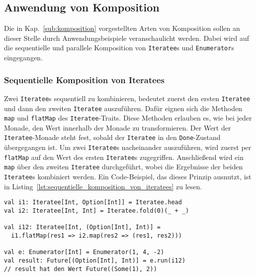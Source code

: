 


\subsection{Anwendung von Komposition} %
\label{sub:anwendung_komposition}

Die in Kap.~\ref{sub:komposition} vorgestellten Arten von Komposition sollen an dieser Stelle durch Anwendungsbeispiele veranschaulicht werden.
Dabei wird auf die sequentielle und parallele Komposition von \lstinline|Iteratee|s und \lstinline|Enumerator|s eingegangen.

\subsubsection{Sequentielle Komposition von Iteratees} %
\label{ssub:anwendung_sequentielle_komposition_von_iteratees}

Zwei \lstinline|Iteratee|s sequentiell zu kombinieren, bedeutet zuerst den ersten \lstinline|Iteratee| und dann den zweiten \lstinline|Iteratee| auszuführen.
Dafür eignen sich die Methoden \lstinline|map| und \lstinline|flatMap| des \lstinline|Iteratee|-Traits.
Diese Methoden erlauben es, wie bei jeder Monade, den Wert innerhalb der Monade zu transformieren.
Der Wert der \lstinline|Iteratee|-Monade steht fest, sobald der \lstinline|Iteratee| in den \lstinline|Done|-Zustand übergegangen ist.
Um zwei \lstinline|Iteratee|s nacheinander auszuführen, wird zuerst per \lstinline|flatMap| auf den Wert des ersten \lstinline|Iteratee|s zugegriffen.
Anschließend wird ein \lstinline|map| über den zweiten \lstinline|Iteratee| durchgeführt, wobei die Ergebnisse der beiden \lstinline|Iteratee|s kombiniert werden.
Ein Code-Beispiel, das dieses Prinzip ausnutzt, ist in Listing~\ref{lst:sequentielle_komposition_von_iteratees} zu lesen.

\begin{lstlisting}[caption=Sequentielle Komposition von Iteratees, label=lst:sequentielle_komposition_von_iteratees]
val i1: Iteratee[Int, Option[Int]] = Iteratee.head
val i2: Iteratee[Int, Int] = Iteratee.fold(0)(_ + _)

val i12: Iteratee[Int, (Option[Int], Int)] =
  i1.flatMap(res1 => i2.map(res2 => (res1, res2)))

val e: Enumerator[Int] = Enumerator(1, 4, -2)
val result: Future[(Option[Int], Int)] = e.run(i12)
// result hat den Wert Future((Some(1), 2))
\end{lstlisting}

